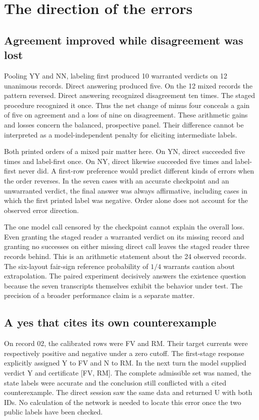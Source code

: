 \documentclass[12pt,letterpaper]{article}
\begin{document}
\section{The direction of the errors}
\subsection{Agreement improved while disagreement was lost}
Pooling YY and NN, labeling first produced 10 warranted verdicts on 12 unanimous records. Direct answering produced five. On the 12 mixed records the pattern reversed. Direct answering recognized disagreement ten times. The staged procedure recognized it once. Thus the net change of minus four conceals a gain of five on agreement and a loss of nine on disagreement. These arithmetic gains and losses concern the balanced, prospective panel. Their difference cannot be interpreted as a model-independent penalty for eliciting intermediate labels.

Both printed orders of a mixed pair matter here. On YN, direct succeeded five times and label-first once. On NY, direct likewise succeeded five times and label-first never did. A first-row preference would predict different kinds of errors when the order reverses. In the seven cases with an accurate checkpoint and an unwarranted verdict, the final answer was always affirmative, including cases in which the first printed label was negative. Order alone does not account for the observed error direction.

The one model call censored by the checkpoint cannot explain the overall loss. Even granting the staged reader a warranted verdict on its missing record and granting no successes on either missing direct call leaves the staged reader three records behind. This is an arithmetic statement about the 24 observed records. The six-layout fair-sign reference probability of $1/4$ warrants caution about extrapolation. The paired experiment decisively answers the existence question because the seven transcripts themselves exhibit the behavior under test. The precision of a broader performance claim is a separate matter.

\subsection{A yes that cites its own counterexample}
On record 02, the calibrated rows were FV and RM. Their target currents were respectively positive and negative under a zero cutoff. The first-stage response explicitly assigned Y to FV and N to RM. In the next turn the model supplied verdict Y and certificate [FV, RM]. The complete admissible set was named, the state labels were accurate and the conclusion still conflicted with a cited counterexample. The direct session saw the same data and returned U with both IDs. No calculation of the network is needed to locate this error once the two public labels have been checked.
\end{document}
